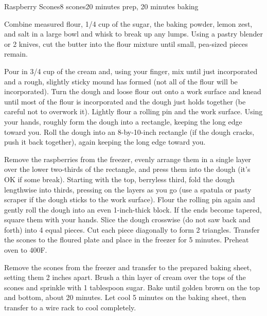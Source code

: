 \documentclass[../Cookbook.tex]{subfiles}
\begin{document}
\begin{recipe}{Raspberry Scones}{8 scones}{20 minutes prep, 20 minutes baking}

Combine measured flour, 1/4 cup of the sugar, the baking powder, lemon zest, and salt in a large bowl and whisk to break up any lumps. Using a pastry blender or 2 knives, cut the butter into the flour mixture until small, pea-sized pieces remain.

Pour in 3/4 cup of the cream and, using your finger, mix until just incorporated and a rough, slightly sticky mound has formed (not all of the flour will be incorporated). Turn the dough and loose flour out onto a work surface and knead until most of the flour is incorporated and the dough just holds together (be careful not to overwork it). Lightly flour a rolling pin and the work surface. Using your hands, roughly form the dough into a rectangle, keeping the long edge toward you. Roll the dough into an 8-by-10-inch rectangle (if the dough cracks, push it back together), again keeping the long edge toward you.

Remove the raspberries from the freezer, evenly arrange them in a single layer over the lower two-thirds of the rectangle, and press them into the dough (it’s OK if some break).
Starting with the top, berryless third, fold the dough lengthwise into thirds, pressing on the layers as you go (use a spatula or pasty scraper if the dough sticks to the work surface).
Flour the rolling pin again and gently roll the dough into an even 1-inch-thick block. If the ends become tapered, square them with your hands. Slice the dough crosswise (do not saw back and forth) into 4 equal pieces. Cut each piece diagonally to form 2 triangles.
Transfer the scones to the floured plate and place in the freezer for 5 minutes.
Preheat oven to 400\0F.

\newstep
Remove the scones from the freezer and transfer to the prepared baking sheet, setting them 2 inches apart. Brush a thin layer of cream over the tops of the scones and sprinkle with 1 tablespoon sugar. Bake until golden brown on the top and bottom, about 20 minutes. Let cool 5 minutes on the baking sheet, then transfer to a wire rack to cool completely.

\end{recipe}
\end{document}
